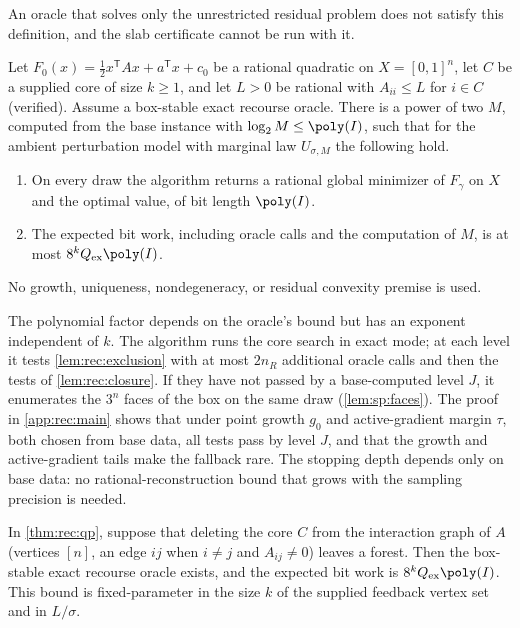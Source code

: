 An oracle that solves only the unrestricted residual problem does not
satisfy this definition, and the slab certificate cannot be run with it.

\begin{theorem}\label{thm:rec:qp}
Let $F_0(x)=\frac12x^{\mathsf T}Ax+a^{\mathsf T}x+c_0$ be a rational quadratic
on $X=[0,1]^n$, let $C$ be a supplied core of size $k\ge1$, and let $L>0$
be rational with $A_{ii}\le L$ for $i\in C$ (verified). Assume a box-stable
exact recourse oracle. There is a power of two $M$, computed from the base
instance with $\log_2M\le\poly(I)$, such that for the ambient perturbation
model with marginal law $U_{\sigma,M}$ the following hold.
\begin{enumerate}[label=(\roman*)]
\item On every draw the algorithm returns a rational global minimizer of
$F_\gamma$ on $X$ and the optimal value, of bit length $\poly(I)$.
\item The expected bit work, including oracle calls and the computation of
$M$, is at most $8^kQ_{\rm ex}\poly(I)$.
\end{enumerate}
No growth, uniqueness, nondegeneracy, or residual convexity premise is used.
\end{theorem}

The polynomial factor depends on the oracle's bound but has an exponent
independent of $k$. The algorithm runs the core search in exact mode; at
each level it tests \cref{lem:rec:exclusion} with at most $2n_R$ additional
oracle calls and then the tests of \cref{lem:rec:closure}. If they have not
passed by a base-computed level $J$, it enumerates the $3^n$ faces of the
box on the same draw (\cref{lem:sp:faces}). The proof in
\cref{app:rec:main} shows that under point growth $g_0$ and active-gradient
margin $\tau$, both chosen from base data, all tests pass by level $J$, and
that the growth and active-gradient tails make the fallback rare. The
stopping depth depends only on base data: no rational-reconstruction bound
that grows with the sampling precision is needed.

\begin{corollary}\label{cor:rec:forest}
In \cref{thm:rec:qp}, suppose that deleting the core $C$ from the
interaction graph of $A$ (vertices $[n]$, an edge $ij$ when $i\ne j$ and
$A_{ij}\ne0$) leaves a forest. Then the box-stable exact recourse oracle
exists, and the expected bit work is $8^kQ_{\rm ex}\poly(I)$. This bound is
fixed-parameter in the size $k$ of the supplied feedback vertex set and in
$L/\sigma$.
\end{corollary}

